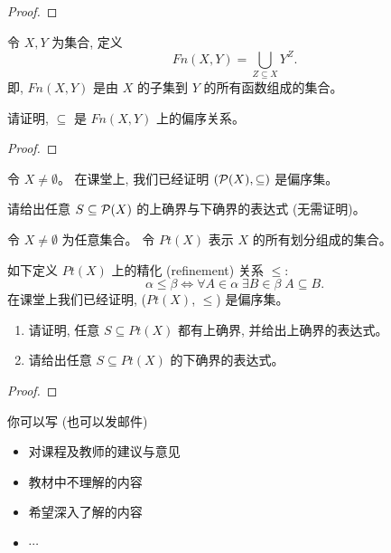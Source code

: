 \documentclass[a4paper, justified]{tufte-handout}
\begin{document}
\begin{proof}
\end{proof}

\begin{problem}[偏序]
  令 $X, Y$ 为集合, 定义
  \[
    Fn(X, Y) = \bigcup_{Z \subseteq X} Y^Z.
  \]
  即, $Fn(X, Y)$ 是由 $X$ 的子集到 $Y$ 的所有函数组成的集合。

  \noindent 请证明, $\subseteq$ 是 $Fn(X, Y)$ 上的偏序关系。
\end{problem}

\begin{proof}
\end{proof}

\begin{problem}
  令 $X \neq \emptyset$。
  在课堂上, 我们已经证明 $(\mathcal{P}(X), \subseteq)$ 是偏序集。

  \noindent 请给出任意 $S \subseteq \mathcal{P}(X)$ 的上确界与下确界的表达式
  (无需证明)。
\end{problem}

\begin{solution}
\end{solution}

\begin{problem}[集合划分与精化关系]
  令 $X \neq \emptyset$ 为任意集合。
  令 $Pt(X)$ 表示 $X$ 的所有划分组成的集合。

  \noindent 如下定义 $Pt(X)$ 上的精化 (refinement) 关系 $\le$:
  \[
    \alpha \le \beta \iff
      \forall A \in \alpha\; \exists B \in \beta\; A \subseteq B.
  \]
  在课堂上我们已经证明, ($Pt(X)$, $\le$) 是偏序集。


  \begin{enumerate}[(1)]
    \item 请证明, 任意 $S \subseteq Pt(X)$ 都有上确界, 并给出上确界的表达式。
    \item 请给出任意 $S \subseteq Pt(X)$ 的下确界的表达式。
  \end{enumerate}
\end{problem}

\begin{proof}
\end{proof}


\begincorrection

\beginfb

你可以写 (也可以发邮件)
\begin{itemize}
  \item 对课程及教师的建议与意见
  \item 教材中不理解的内容
  \item 希望深入了解的内容
  \item $\cdots$
\end{itemize}
\end{document}
